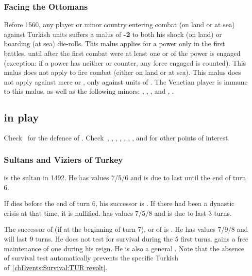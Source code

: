 \subsubsection{Facing the Ottomans}
\aparag Before 1560, any player or minor country entering combat (on
land or at sea) against Turkish units suffers a malus of {\bf -2} to
both his shock (on land) or boarding (at sea) die-rolls.
\aparag This malus applies for a power only in the first battles, until
after the first combat were at least one \ARMY or \FLEET of the power is
engaged (exception: if a power has neither \ARMY or \FLEET counter, any
force engaged is counted).  This malus does not apply to fire combat
(either on land or at sea). This malus does not apply against mere
\VASSAL or \TUR, only against units of \TUR.
\aparag
The Venetian player is immune to this malus, as well as the following
minors: , , ,  and
, .

\subsection{ in play}

Check~ for the defence of
. Check~,
, ,
, ,
, ,
 and 
for other points of interest.

\subsubsection{Sultans and Viziers of Turkey}
 is the sultan in 1492. He has
values 7/5/6 and is due to last until the end of turn 6.

 If  dies before
the end of turn 6, his successor is . If there had
been a dynastic crisis at that time, it is nullified. 
has values 7/5/8 and is due to last 3 turns.

 The successor of  (if at the beginning of turn 7), or of  is
. He has values 7/9/8 and will last 9 turns. He does
not test for survival during the 5 first turns. \TUR gains a free
maintenance of one \ARMY\faceplus \Janissaire during his reign. He is
also a general .
\bparag Note that the absence of survival test automatically prevents the
specific Turkish \REVOLT of~\ref{chEvents:Survival:TUR revolt}.

